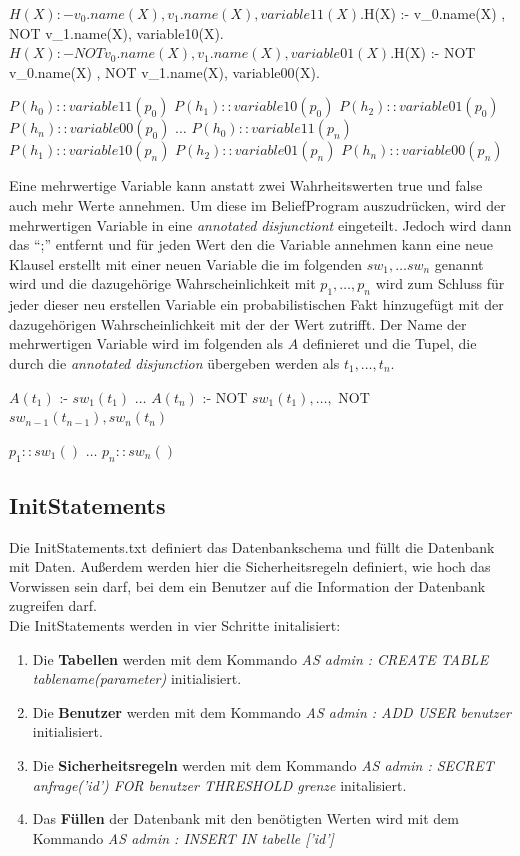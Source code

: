 \documentclass[german,version-2020-11]{uzl-thesis}
\begin{document}
\begin{Pseudocode}[caption={Beispiel mit 2 Variablen als Abhängigkei}, label={lst-2}, numbers=left]
$H(X) :- v_0.name(X) , v_1.name(X), variable11(X).
$H(X) :- v_0.name(X) , NOT v_1.name(X), variable10(X).
$H(X) :- NOT v_0.name(X) , v_1.name(X), variable01(X).
$H(X) :- NOT v_0.name(X) , NOT v_1.name(X), variable00(X).

$P(h_0) :: variable11(p_0)$
$P(h_1) :: variable10(p_0)$
$P(h_2) :: variable01(p_0)$
$P(h_n) :: variable00(p_0)$
$\dots$
$P(h_0) :: variable11(p_n)$
$P(h_1) :: variable10(p_n)$
$P(h_2) :: variable01(p_n)$
$P(h_n) :: variable00(p_n)$
\end{Pseudocode} 
Eine mehrwertige Variable  kann anstatt zwei Wahrheitswerten true und false auch mehr Werte annehmen. 
Um diese im BeliefProgram auszudrücken, wird der mehrwertigen Variable in eine \textit{annotated disjunctiont} eingeteilt. Jedoch wird dann das \enquote{;} entfernt und für jeden Wert den die Variable annehmen kann eine neue Klausel erstellt mit einer neuen Variable die im folgenden $sw_1, \dots sw_n$ genannt wird und die dazugehörige Wahrscheinlichkeit mit $p_1, \dots , p_n$ wird zum Schluss für jeder dieser neu erstellen Variable ein probabilistischen Fakt hinzugefügt mit der dazugehörigen Wahrscheinlichkeit mit der der Wert zutrifft.
Der Name der mehrwertigen Variable wird im folgenden als $A$ definieret und die Tupel, die durch die \textit{annotated disjunction} übergeben werden als $t_1 , \dots , t_n$. 
\begin{Pseudocode}[caption={Vorgehensweise bei \textit{annotated disjunction} }, label={lst-2}, numbers=left]
$A(t_1)$ :- $sw_1(t_1)$
$\dots$
$A(t_n)$ :- NOT $sw_1(t_1), \dots ,$ NOT $sw_{n−1}(t_{n−1}), sw_n(t_n)$

$p_1::sw_1( )$
$\dots$
$p_n::sw_n( )$

\end{Pseudocode} 
\subsection{InitStatements}
Die InitStatements.txt definiert das Datenbankschema und füllt die Datenbank mit Daten. Außerdem werden hier die Sicherheitsregeln definiert, wie hoch das Vorwissen sein darf, bei dem ein Benutzer auf die Information der Datenbank zugreifen darf. \\ 
Die InitStatements werden in vier Schritte initalisiert:
\begin{enumerate}
	\item Die \textbf{Tabellen } werden mit dem Kommando \textit{AS admin : CREATE TABLE tablename(parameter)} initialisiert. 
	\item  Die \textbf{Benutzer  } werden mit dem Kommando \textit{AS admin : ADD USER benutzer} initialisiert. 
	\item Die \textbf{Sicherheitsregeln}  werden mit dem Kommando \textit{AS admin : SECRET anfrage('id') FOR benutzer THRESHOLD grenze} initalisiert.
	\item Das \textbf{Füllen} der Datenbank mit den benötigten Werten wird mit dem Kommando \textit{AS admin : INSERT IN tabelle ['id']} 
\end{enumerate} 
\end{document}
